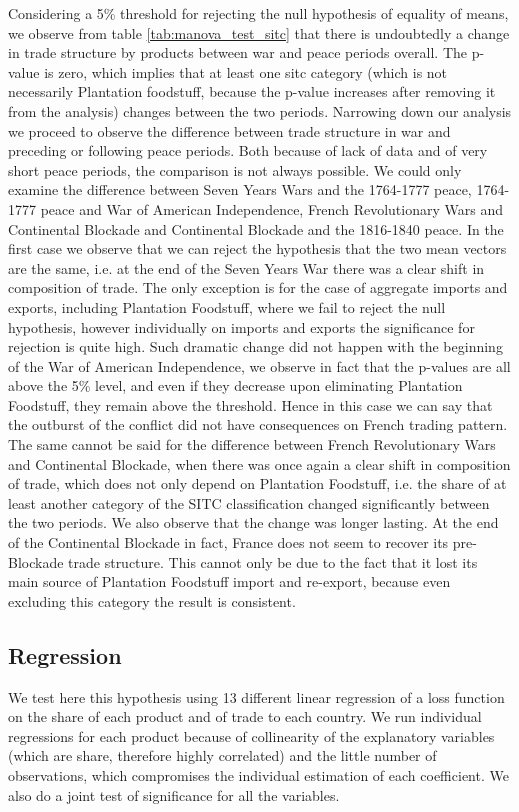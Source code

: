 \documentclass[12pt,a4paper,notitlepage,english]{article}
\begin{document}
Considering a 5\% threshold for rejecting the null hypothesis of equality of means, we observe from table \ref{tab:manova_test_sitc} that there is undoubtedly a change in trade structure by products between war and peace periods overall. The p-value is zero, which implies that at least one sitc category (which is not necessarily Plantation foodstuff, because the p-value increases after removing it from the analysis) changes between the two periods. Narrowing down our analysis we proceed to observe the difference between trade structure in war and preceding or following peace periods. Both because of lack of data and of very short peace periods, the comparison is not always possible. We could only examine the difference between Seven Years Wars and the 1764-1777 peace, 1764-1777 peace and War of American Independence, French Revolutionary Wars and Continental Blockade and Continental Blockade and the 1816-1840 peace. In the first case we observe that we can reject the hypothesis that the two mean vectors are the same, i.e. at the end of the Seven Years War there was a clear shift in composition of trade. The only exception is for the case of aggregate imports and exports, including Plantation Foodstuff, where we fail to reject the null hypothesis, however individually on imports and exports the significance for rejection is quite high. Such dramatic change did not happen with the beginning of the War of American Independence, we observe in fact that the p-values are all above the 5\% level, and even if they decrease upon eliminating Plantation Foodstuff, they remain above the threshold. Hence in this case we can say that the outburst of the conflict did not have consequences on French trading pattern. The same cannot be said for the difference between French Revolutionary Wars and Continental Blockade, when there was once again a clear shift in composition of trade, which does not only depend on Plantation Foodstuff, i.e. the share of at least another category of the SITC classification changed significantly between the two periods. We also observe that the change was longer lasting. At the end of the Continental Blockade in fact, France does not seem to recover its pre-Blockade trade structure. This cannot only be due to the fact that it lost its main source of Plantation Foodstuff import and re-export, because even excluding this category the result is consistent. 

\subsection{Regression}
We test here this hypothesis using 13 different linear regression of a loss function on the share of each product and of trade to each country. We run individual regressions for each product because of collinearity of the explanatory variables (which are share, therefore highly correlated) and the little number of observations, which compromises the individual estimation of each coefficient. We also do a joint test of significance for all the variables. 
\end{document}
